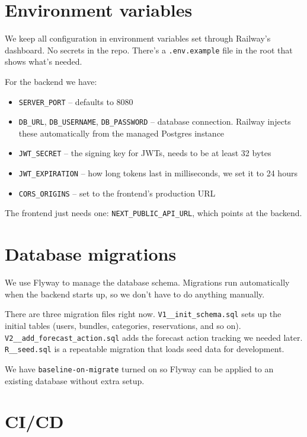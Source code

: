 \documentclass[a4paper,11pt]{article}
\begin{document}
\section{Environment variables}

We keep all configuration in environment variables set through Railway's dashboard. No secrets in the repo. There's a \texttt{.env.example} file in the root that shows what's needed.

For the backend we have:

\begin{itemize}
  \item \texttt{SERVER\_PORT} -- defaults to 8080
  \item \texttt{DB\_URL}, \texttt{DB\_USERNAME}, \texttt{DB\_PASSWORD} -- database connection. Railway injects these automatically from the managed Postgres instance
  \item \texttt{JWT\_SECRET} -- the signing key for JWTs, needs to be at least 32 bytes
  \item \texttt{JWT\_EXPIRATION} -- how long tokens last in milliseconds, we set it to 24 hours
  \item \texttt{CORS\_ORIGINS} -- set to the frontend's production URL
\end{itemize}

The frontend just needs one: \texttt{NEXT\_PUBLIC\_API\_URL}, which points at the backend.

\section{Database migrations}

We use Flyway to manage the database schema. Migrations run automatically when the backend starts up, so we don't have to do anything manually.

There are three migration files right now. \texttt{V1\_\_init\_schema.sql} sets up the initial tables (users, bundles, categories, reservations, and so on). \texttt{V2\_\_add\_forecast\_action.sql} adds the forecast action tracking we needed later. \texttt{R\_\_seed.sql} is a repeatable migration that loads seed data for development.

We have \texttt{baseline-on-migrate} turned on so Flyway can be applied to an existing database without extra setup.

\section{CI/CD}
\end{document}
